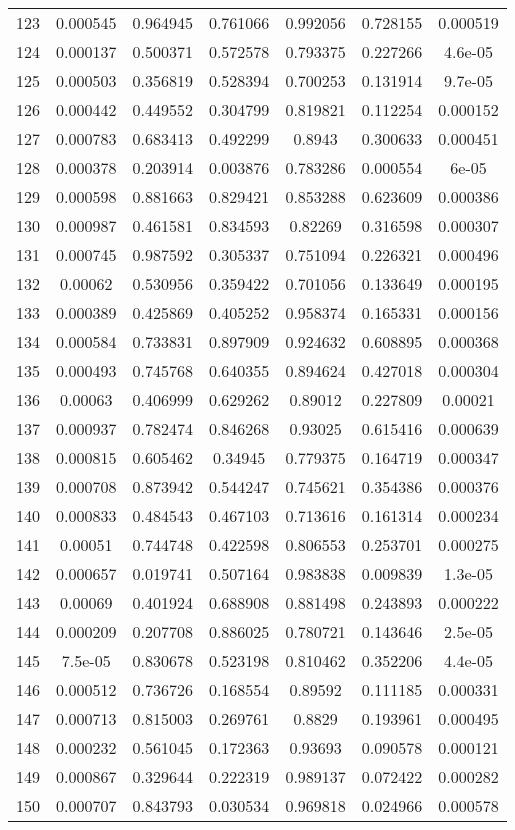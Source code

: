 \begin{table}
\begin{tabular}{c|c|c|c|c|c|c}
123 & 0.000545 & 0.964945 & 0.761066 & 0.992056 & 0.728155 & 0.000519\\
124 & 0.000137 & 0.500371 & 0.572578 & 0.793375 & 0.227266 & 4.6e-05\\
125 & 0.000503 & 0.356819 & 0.528394 & 0.700253 & 0.131914 & 9.7e-05\\
126 & 0.000442 & 0.449552 & 0.304799 & 0.819821 & 0.112254 & 0.000152\\
127 & 0.000783 & 0.683413 & 0.492299 & 0.8943 & 0.300633 & 0.000451\\
128 & 0.000378 & 0.203914 & 0.003876 & 0.783286 & 0.000554 & 6e-05\\
129 & 0.000598 & 0.881663 & 0.829421 & 0.853288 & 0.623609 & 0.000386\\
130 & 0.000987 & 0.461581 & 0.834593 & 0.82269 & 0.316598 & 0.000307\\
131 & 0.000745 & 0.987592 & 0.305337 & 0.751094 & 0.226321 & 0.000496\\
132 & 0.00062 & 0.530956 & 0.359422 & 0.701056 & 0.133649 & 0.000195\\
133 & 0.000389 & 0.425869 & 0.405252 & 0.958374 & 0.165331 & 0.000156\\
134 & 0.000584 & 0.733831 & 0.897909 & 0.924632 & 0.608895 & 0.000368\\
135 & 0.000493 & 0.745768 & 0.640355 & 0.894624 & 0.427018 & 0.000304\\
136 & 0.00063 & 0.406999 & 0.629262 & 0.89012 & 0.227809 & 0.00021\\
137 & 0.000937 & 0.782474 & 0.846268 & 0.93025 & 0.615416 & 0.000639\\
138 & 0.000815 & 0.605462 & 0.34945 & 0.779375 & 0.164719 & 0.000347\\
139 & 0.000708 & 0.873942 & 0.544247 & 0.745621 & 0.354386 & 0.000376\\
140 & 0.000833 & 0.484543 & 0.467103 & 0.713616 & 0.161314 & 0.000234\\
141 & 0.00051 & 0.744748 & 0.422598 & 0.806553 & 0.253701 & 0.000275\\
142 & 0.000657 & 0.019741 & 0.507164 & 0.983838 & 0.009839 & 1.3e-05\\
143 & 0.00069 & 0.401924 & 0.688908 & 0.881498 & 0.243893 & 0.000222\\
144 & 0.000209 & 0.207708 & 0.886025 & 0.780721 & 0.143646 & 2.5e-05\\
145 & 7.5e-05 & 0.830678 & 0.523198 & 0.810462 & 0.352206 & 4.4e-05\\
146 & 0.000512 & 0.736726 & 0.168554 & 0.89592 & 0.111185 & 0.000331\\
147 & 0.000713 & 0.815003 & 0.269761 & 0.8829 & 0.193961 & 0.000495\\
148 & 0.000232 & 0.561045 & 0.172363 & 0.93693 & 0.090578 & 0.000121\\
149 & 0.000867 & 0.329644 & 0.222319 & 0.989137 & 0.072422 & 0.000282\\
150 & 0.000707 & 0.843793 & 0.030534 & 0.969818 & 0.024966 & 0.000578\\
\end{tabular}
\end{table}
